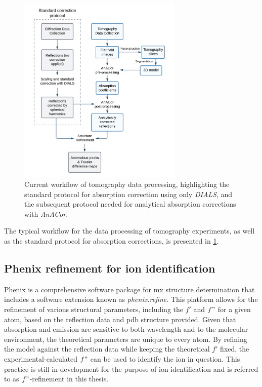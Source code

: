 \begin{figure}[H]
    \centering
    \includegraphics[width = 0.7\textwidth]{images/Tomography Workflow.png}
    \caption{Current workflow of tomography data processing, highlighting the standard protocol for absorption correction using only \textit{DIALS}, and the subsequent protocol needed for analytical absorption corrections with \textit{AnACor}.}
    \label{fig:workflow}
\end{figure}

The typical workflow for the data processing of tomography experiments, as well as the standard  protocol for absorption corrections, is presented in \cref{fig:workflow}.%


\subsection{Phenix refinement for ion identification}%

Phenix is a comprehensive software package for \ac{mx} structure determination \cite{Adams2011} that includes a software extension known as \textit{phenix.refine}. This platform allows for the refinement of various structural parameters, including the $f'$ and $f"$ for a given atom, based on the reflection data and \ac{pdb} structure provided. Given that absorption and emission are sensitive to both wavelength and to the molecular environment, the theoretical parameters are unique to every atom. By refining the model against the reflection data while keeping the theoretical $f'$ fixed, the experimental-calculated $f"$ can be used to identify the ion in question. This practice is still in development for the purpose of ion identification and is referred to as $f"$-refinement in this thesis.%

